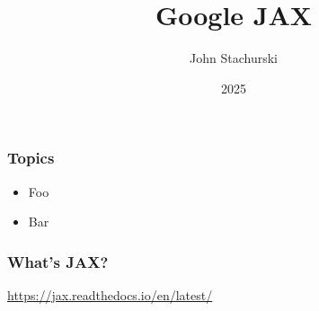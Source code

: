 

\title{Google JAX}



\author{John Stachurski}


\date{2025}




\begin{frame}
  \titlepage
\end{frame}



\begin{frame}
    \frametitle{Topics}

    \begin{itemize}
        \item Foo
        \vspace{0.5em}
        \item Bar
        \vspace{0.5em}
    \end{itemize}

\end{frame}

\begin{frame}
    \frametitle{What's JAX?}

    \begin{figure}
       \centering
    \end{figure}
    
            \vspace{0.5em}

    \begin{center}
        \url{https://jax.readthedocs.io/en/latest/}
    \end{center}

    

\end{frame}

